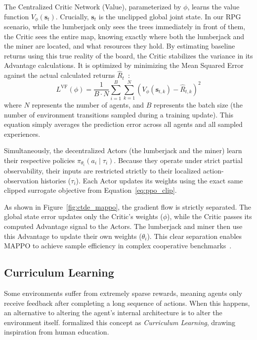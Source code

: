 The Centralized Critic Network (Value), parameterized by $\phi$, learns the value function $V_\phi(\mathbf{s}_t)$. Crucially, $\mathbf{s}_t$ is the unclipped global joint state. In our RPG scenario, while the lumberjack only sees the trees immediately in front of them, the Critic sees the entire map, knowing exactly where both the lumberjack and the miner are located, and what resources they hold. By estimating baseline returns using this true reality of the board, the Critic stabilizes the variance in its Advantage calculations. It is optimized by minimizing the Mean Squared Error against the actual calculated returns $\hat{R}_t$~\parencite{Yu_Velu_Vinitsky_Gao_Wang_Bayen_Wu_2022}:
\begin{equation}
    L^{\text{VF}}(\phi) = \frac{1}{B \cdot N} \sum_{i=1}^B \sum_{k=1}^N \left( V_\phi(\mathbf{s}_{t,k}) - \hat{R}_{t,k} \right)^2
\end{equation}
where $N$ represents the number of agents, and $B$ represents the batch size (the number of environment transitions sampled during a training update). This equation simply averages the prediction error across all agents and all sampled experiences.

Simultaneously, the decentralized Actors (the lumberjack and the miner) learn their respective policies $\pi_{\theta_i}(a_i \mid \tau_i)$. Because they operate under strict partial observability, their inputs are restricted strictly to their localized action-observation histories ($\tau_i$). Each Actor updates its weights using the exact same clipped surrogate objective from Equation~\ref{eq:ppo_clip}. 

As shown in Figure~\ref{fig:ctde_mappo}, the gradient flow is strictly separated. The global state error updates only the Critic's weights ($\phi$), while the Critic passes its computed Advantage signal to the Actors. The lumberjack and miner then use this Advantage to update their own weights ($\theta_i$). This clear separation enables MAPPO to achieve sample efficiency in complex cooperative benchmarks~\parencite{Yu_Velu_Vinitsky_Gao_Wang_Bayen_Wu_2022}.

\subsection{Curriculum Learning}
\label{sec:curriculum_learning}

Some environments suffer from extremely sparse rewards, meaning agents only receive feedback after completing a long sequence of actions. When this happens, an alternative to altering the agent's internal architecture is to alter the environment itself. \textcite{Bengio_Louradour_Collobert_Weston_2009} formalized this concept as \emph{Curriculum Learning}, drawing inspiration from human education. 

